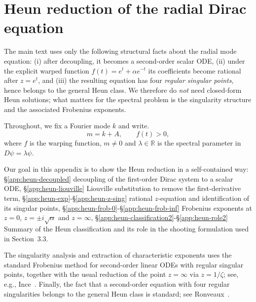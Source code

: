\documentclass[11pt]{article}
\theoremstyle{definition}
\numberwithin{equation}{section}
\begin{document}
\appendix

\section{Heun reduction of the radial Dirac equation}\label{app:heun}

The main text uses only the following structural facts about the radial mode equation:
(i) after decoupling, it becomes a second-order scalar ODE,
(ii) under the explicit warped function $f(t)=e^t+\alpha e^{-t}$ its coefficients become rational after $z=e^t$,
and (iii) the resulting equation has four \emph{regular singular points}, hence belongs to the general Heun class.
We therefore do \emph{not} need closed-form Heun solutions; what matters for the spectral problem is the singularity
structure and the associated Frobenius exponents.


Throughout, we fix a Fourier mode $k$ and write.
\begin{equation}
m=k+A, \qquad f(t)>0,
\end{equation}
where $f$ is the warping function, $m \neq 0$ and $\lambda\in\mathbb{R}$ is the spectral parameter in $D\psi=\lambda\psi$.


\medskip
\noindent

Our goal in this appendix is to show the Heun reduction in a self-contained way:
\S\ref{app:heun-decoupled} decoupling of the first-order Dirac system to a scalar ODE,
\S\ref{app:heun-liouville} Liouville substitution to remove the first-derivative term,
\S\ref{app:heun-exp}-\S\ref{app:heun-z-sing} rational $z$-equation and identification of its singular points,
\S\ref{app:heun-frob-0}-\S\ref{app:heun-frob-inf} Frobenius exponents at $z=0$, $z=\pm i\sqrt{\alpha}$ and $z=\infty$,
\S\ref{app:heun-classification2}-\S\ref{app:heun-role2} Summary of the Heun classification and its role in the shooting formulation used in Section~3.3.



\noindent
The singularity analysis and extraction of characteristic exponents uses the standard Frobenius method for
second-order linear ODEs with regular singular points, together with the usual reduction of the point
$z=\infty$ via $z=1/\zeta$; see, e.g., Ince~\cite{InceODE}. Finally, the fact that a second-order equation
with four regular singularities belongs to the general Heun class is standard; see Ronveaux~\cite{RonveauxHeun}.
\end{document}
